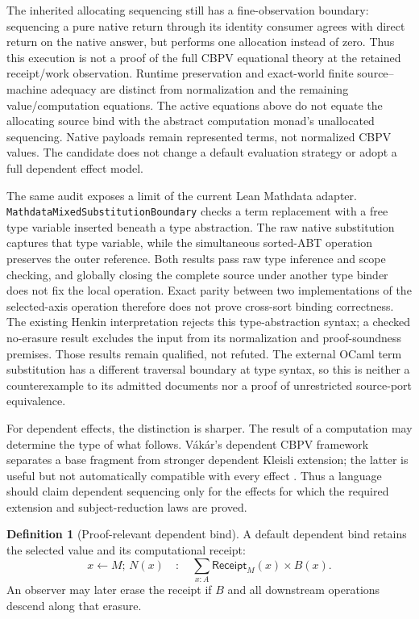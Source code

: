 \documentclass[11pt]{article}
\theoremstyle{definition}
\newtheorem{definition}[theorem]{Definition}
\theoremstyle{remark}
\begin{document}
The inherited allocating sequencing still has a fine-observation boundary:
sequencing a pure native return through its identity consumer agrees with
direct return on the native answer, but performs one allocation instead of
zero. Thus this execution is not a proof of the full CBPV equational theory
at the retained receipt/work observation. Runtime preservation and exact-world
finite source--machine adequacy are distinct from normalization and the
remaining value/computation equations. The active equations above do not
equate the allocating source bind with the abstract computation monad's
unallocated sequencing. Native payloads remain represented
terms, not normalized CBPV values. The candidate does not change a default
evaluation strategy or adopt a full dependent effect model.

The same audit exposes a limit of the current Lean Mathdata adapter.
\nolinkurl{MathdataMixedSubstitutionBoundary} checks a term replacement with
a free type variable inserted beneath a type abstraction. The raw native
substitution captures that type variable, while the simultaneous sorted-ABT
operation preserves the outer reference. Both results pass raw type inference
and scope checking, and globally closing the complete source under another
type binder does not fix the local operation. Exact parity between two
implementations of the selected-axis operation therefore does not prove
cross-sort binding correctness. The existing Henkin interpretation rejects
this type-abstraction syntax; a checked no-erasure result excludes the input
from its normalization and proof-soundness premises. Those results remain
qualified, not refuted. The external OCaml term substitution has a different
traversal boundary at type syntax, so this is neither a counterexample to
its admitted documents nor a proof of unrestricted source-port equivalence.

For dependent effects, the distinction is sharper.  The result of a computation
may determine the type of what follows.  V\'ak\'ar's dependent CBPV framework
separates a base fragment from stronger dependent Kleisli extension; the latter
is useful but not automatically compatible with every effect
\cite{VakarDependentEffects}.  Thus a language should claim dependent sequencing
only for the effects for which the required extension and subject-reduction laws
are proved.

\begin{definition}[Proof-relevant dependent bind]
A default dependent bind retains the selected value and its computational
receipt:
\[
  x \leftarrow M;\,N(x)
  \quad:\quad
  \sum_{x:A}\mathsf{Receipt}_M(x)\times B(x).
\]
An observer may later erase the receipt if $B$ and all downstream operations
descend along that erasure.
\end{definition}
\end{document}
